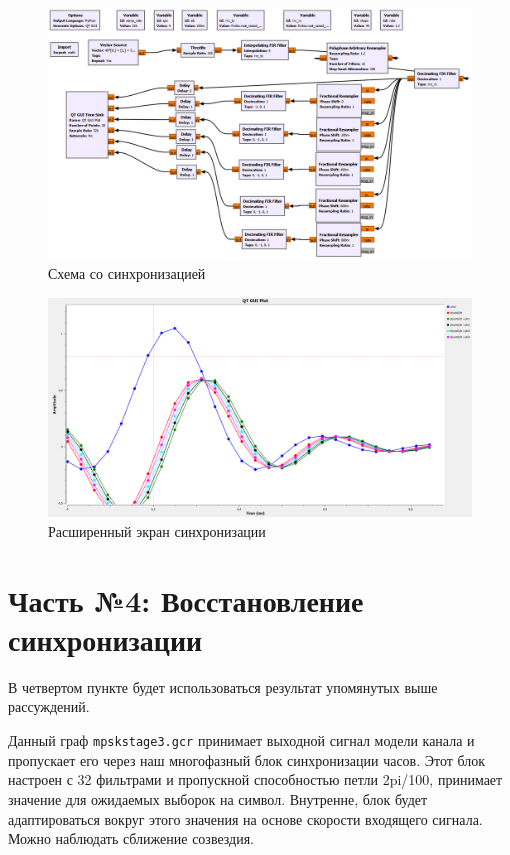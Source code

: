 \documentclass[a4paper]{article}
\begin{document}
            \begin{figure}[H]
                \centering
                \includegraphics[width=\textwidth]{ex_3_7.png}
                \caption{Схема со синхронизацией}
                \label{fig:ex_3_7}
            \end{figure}
            
            \begin{figure}[H]
                \centering
                \includegraphics[width=\textwidth]{ex_3_8.png}
                \caption{Расширенный экран синхронизации}
                \label{fig:ex_3_8}
            \end{figure}
            
    \newpage
        \section{Часть №4: Восстановление синхронизации}
            В четвертом пункте будет использоваться результат упомянутых выше рассуждений.
            
            Данный граф \texttt{mpskstage3.gcr} принимает выходной сигнал модели канала и пропускает его через наш многофазный блок синхронизации часов. Этот блок настроен с 32 фильтрами и пропускной способностью петли 2pi/100, принимает значение для ожидаемых выборок на символ. Внутренне, блок будет адаптироваться вокруг этого значения на основе скорости входящего сигнала. Можно наблюдать сближение созвездия.
            
\end{document}
